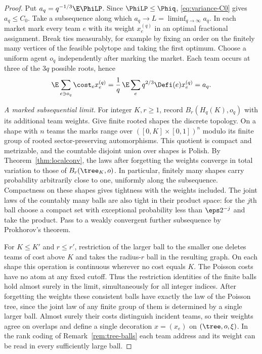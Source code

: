 \begin{proof}
Put $a_q=q^{-1/3}\E\PhiLP$. Since $\PhiLP\le\Phiq$, \eqref{eq:variance-C0} gives
$a_q\le C_0$. Take a subsequence along which $a_q\to L=\liminf_{q\to\infty}a_q$.
In each market mark every team $e$ with its weight $x^{(q)}_e$ in an optimal fractional
assignment. Break ties measurably, for example by fixing an order on the finitely many
vertices of the feasible polytope and taking the first optimum. Choose a uniform agent
$o_q$ independently after marking the market. Each team occurs at three of the $3q$
possible roots, hence
\begin{equation}\label{eq:lp-limit-rootcost}
\E\sum_{e\ni o_q}\cost_e x^{(q)}_e
=\frac{1}{q}\,\E\sum_e q^{2/3}\Defi(e)x^{(q)}_e=a_q .
\end{equation}

\emph{A marked subsequential limit.}
For integer $K,r\ge1$, record $B_r(H_q(K),o_q)$ with its additional team weights.
Give finite rooted shapes the discrete topology. On a shape with $n$ teams the marks
range over $([0,K]\times[0,1])^n$ modulo its finite group of rooted sector-preserving
automorphisms. This quotient is compact and metrizable, and the countable disjoint
union over shapes is Polish. By Theorem~\ref{thm:localconv}, the laws after forgetting the
weights converge in total variation to those of $B_r(\tree_K,o)$. In particular, finitely
many shapes carry probability arbitrarily close to one, uniformly along the subsequence.
Compactness on these shapes gives tightness with the weights included. The joint laws of
the countably many balls are also tight in their product space: for the $j$th ball choose
a compact set with exceptional probability less than $\eps 2^{-j}$ and take the product.
Pass to a weakly convergent further subsequence by Prokhorov's theorem.

For $K\le K'$ and $r\le r'$, restriction of the larger ball to the smaller one deletes
teams of cost above $K$ and takes the radius-$r$ ball in the resulting graph.
On each shape this operation is continuous wherever no cost equals $K$. The Poisson
costs have no atom at any fixed cutoff. Thus the restriction identities of the finite
balls hold almost surely in the limit, simultaneously for all integer indices. After
forgetting the weights these consistent balls have exactly the law of the Poisson tree,
since the joint law of any finite group of them is determined by a single larger ball.
Almost surely their costs distinguish incident teams, so their weights agree on overlaps
and define a single decoration $x=(x_e)$ on $(\tree,o,\xi)$. In the rank coding of
Remark~\ref{rem:tree-balls} each team address and its weight can be read in every
sufficiently large ball.


\end{proof}
